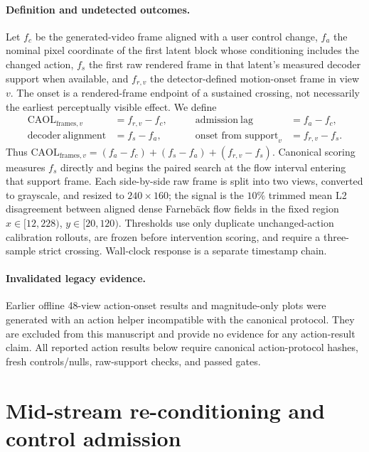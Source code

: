 \documentclass[11pt]{article}
\newcommand{\caol}{CAOL}
\begin{document}
\paragraph{Definition and undetected outcomes.}
Let $f_c$ be the generated-video frame aligned with a user control change, $f_a$ the nominal pixel coordinate of the first latent block whose conditioning includes the changed action, $f_s$ the first raw rendered frame in that latent's measured decoder support when available, and $f_{r,v}$ the detector-defined motion-onset frame in view $v$. The onset is a rendered-frame endpoint of a sustained crossing, not necessarily the earliest perceptually visible effect. We define
\[
\begin{aligned}
\mathrm{\caol}_{\mathrm{frames},v}&=f_{r,v}-f_c,
&\qquad \mathrm{admission\ lag}&=f_a-f_c,\\
\mathrm{decoder\ alignment}&=f_s-f_a,
&\qquad \text{onset from support}_v&=f_{r,v}-f_s.
\end{aligned}
\]
Thus $\mathrm{\caol}_{\mathrm{frames},v}=(f_a-f_c)+(f_s-f_a)+(f_{r,v}-f_s)$. Canonical scoring measures $f_s$ directly and begins the paired search at the flow interval entering that support frame. Each side-by-side raw frame is split into two views, converted to grayscale, and resized to $240\times160$; the signal is the $10\%$ trimmed mean L2 disagreement between aligned dense Farneb\"ack flow fields in the fixed region $x\in[12,228)$, $y\in[20,120)$. Thresholds use only duplicate unchanged-action calibration rollouts, are frozen before intervention scoring, and require a three-sample strict crossing. Wall-clock response is a separate timestamp chain.

\paragraph{Invalidated legacy evidence.}
Earlier offline 48-view action-onset results and magnitude-only plots were generated with an action helper incompatible with the canonical protocol. They are excluded from this manuscript and provide no evidence for any action-result claim. All reported action results below require canonical action-protocol hashes, fresh controls/nulls, raw-support checks, and passed gates.

\section{Mid-stream re-conditioning and control admission}
\label{sec:serving}
\end{document}
